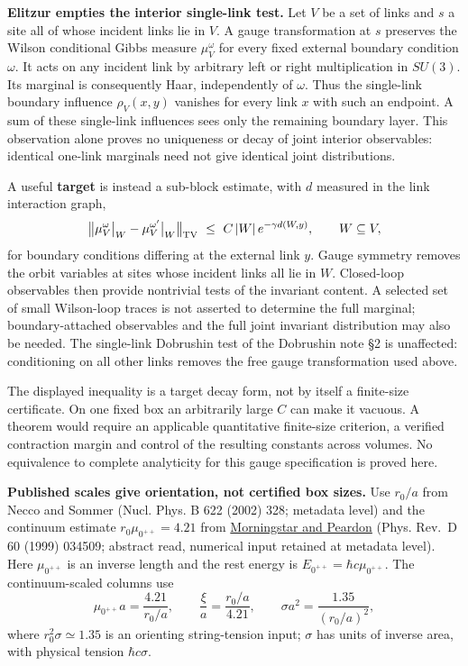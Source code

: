 \documentclass[11pt,a4paper]{article}
\begin{document}
\textbf{Elitzur empties the interior single-link test.} Let \(V\) be a
set of links and \(s\) a site all of whose incident links lie in \(V\).
A gauge transformation at \(s\) preserves the Wilson conditional Gibbs
measure \(\mu_V^\omega\) for every fixed external boundary condition
\(\omega\). It acts on any incident link by arbitrary left or right
multiplication in \(SU(3)\). Its marginal is consequently Haar,
independently of \(\omega\). Thus the single-link boundary influence
\(\rho_V(x,y)\) vanishes for every link \(x\) with such an endpoint. A
sum of these single-link influences sees only the remaining boundary
layer. This observation alone proves no uniqueness or decay of joint
interior observables: identical one-link marginals need not give
identical joint distributions.

A useful \textbf{target} is instead a sub-block estimate, with \(d\)
measured in the link interaction graph,
\[\big\|\mu_V^{\omega}\big|_W-\mu_V^{\omega'}\big|_W\big\|_{\rm TV}
\ \le\ C\,|W|\,e^{-\gamma d(W,y)},
\qquad W\subseteq V,
\] for boundary conditions differing at the external link \(y\). Gauge
symmetry removes the orbit variables at sites whose incident links all
lie in \(W\). Closed-loop observables then provide nontrivial tests of
the invariant content. A selected set of small Wilson-loop traces is not
asserted to determine the full marginal; boundary-attached observables
and the full joint invariant distribution may also be needed. The
single-link Dobrushin test of the Dobrushin note §2 is unaffected:
conditioning on all other links removes the free gauge transformation
used above.

The displayed inequality is a target decay form, not by itself a
finite-size certificate. On one fixed box an arbitrarily large \(C\) can
make it vacuous. A theorem would require an applicable quantitative
finite-size criterion, a verified contraction margin and control of the
resulting constants across volumes. No equivalence to complete
analyticity for this gauge specification is proved here.

\textbf{Published scales give orientation, not certified box sizes.} Use
\(r_0/a\) from Necco and Sommer (Nucl. Phys. B 622 (2002) 328; metadata
level) and the continuum estimate \(r_0\mu_{0^{++}}=4.21\) from
\href{https://arxiv.org/abs/hep-lat/9901004}{Morningstar and Peardon}
(Phys. Rev.~D 60 (1999) 034509; abstract read, numerical input retained
at metadata level). Here \(\mu_{0^{++}}\) is an inverse length and the
rest energy is \(E_{0^{++}}=\hbar c\mu_{0^{++}}\). The continuum-scaled
columns use \[\mu_{0^{++}}a=\frac{4.21}{r_0/a},\qquad
\frac{\xi}{a}=\frac{r_0/a}{4.21},\qquad
\sigma a^2=\frac{1.35}{(r_0/a)^2},\] where \(r_0^2\sigma\simeq1.35\) is
an orienting string-tension input; \(\sigma\) has units of inverse area,
with physical tension \(\hbar c\sigma\).
\end{document}
